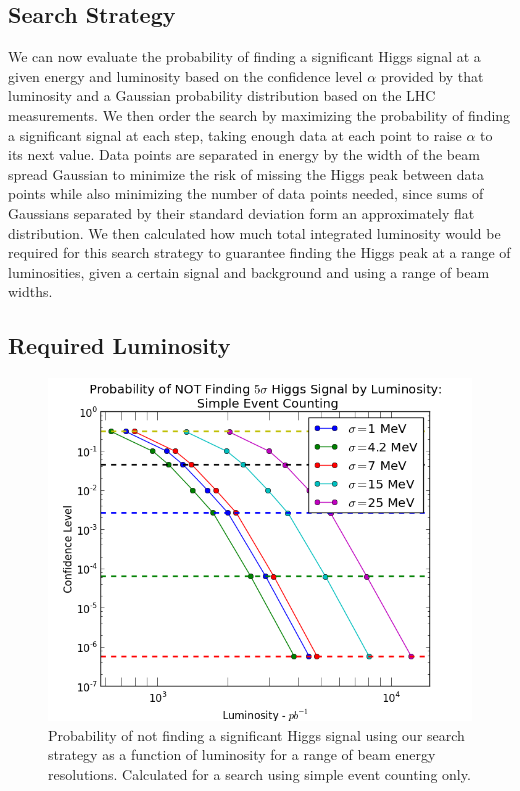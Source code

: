 \documentclass[a4paper]{article}
\begin{document}
	\subsection{Search Strategy}
	We can now evaluate the probability of finding a significant Higgs signal at a given energy and luminosity based on the confidence level $\alpha$ provided by that luminosity and a Gaussian probability distribution based on the LHC measurements. We then order the search by maximizing the probability of finding a significant signal at each step, taking enough data at each point to raise $\alpha$ to its next value. Data points are separated in energy by the width of the beam spread Gaussian to minimize the risk of missing the Higgs peak between data points while also minimizing the number of data points needed, since sums of Gaussians separated by their standard deviation form an approximately flat distribution. We then calculated how much total integrated luminosity would be required for this search strategy to guarantee finding the Higgs peak at a range of luminosities, given a certain signal and background and using a range of beam widths.

	\subsection{Required Luminosity}
	\begin{figure}
		\includegraphics[width=\textwidth]{lum-needed-total-raw}
		\caption{Probability of not finding a significant Higgs signal using our search strategy as a function of luminosity for a range of beam energy resolutions. Calculated for a search using simple event counting only.\label{fig:lum-needed-total-raw}}
	\end{figure}
\end{document}
